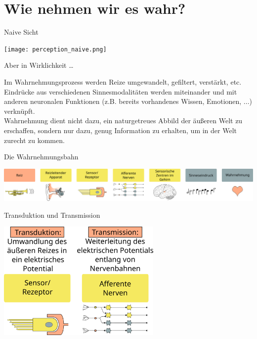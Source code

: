 \documentclass{beamer}
\begin{document}
\section{Wie nehmen wir es wahr?}


\begin{frame}{Naive Sicht}

\begin{center}
    \texttt{[image: perception\_naive.png]}
\end{center}
    
\end{frame}


\begin{frame}{Aber in Wirklichkeit \dots}

Im Wahrnehmungsprozess werden Reize umgewandelt, gefiltert, verstärkt, etc.  Eindrücke aus verschiedenen Sinnesmodalitäten werden miteinander und mit anderen neuronalen Funktionen (z.B. bereits vorhandenes Wissen, Emotionen, ...) verknüpft.  \\[1cm]

Wahrnehmung dient nicht dazu, ein naturgetreues Abbild der äußeren Welt zu erschaffen, sondern nur dazu, genug Information zu erhalten, um in der Welt zurecht zu kommen. 

\end{frame}


\begin{frame}{Die Wahrnehmungsbahn}

\begin{center}
    \includegraphics[width=\textwidth]{wahrnehmungsprozess.png}
\end{center}
    
\end{frame}
 
 


\begin{frame}{Transduktion und Transmission}

\begin{center}
    \includegraphics[width=0.6\textwidth]{wahrnehmungsprozess_transduktion_transmission.png}
\end{center}
    
\end{frame}
\end{document}
